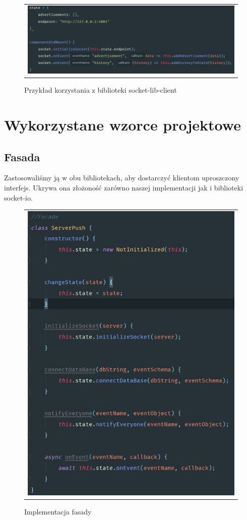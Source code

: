 \documentclass{sprawozdanie-agh}
\begin{document}
	\begin{figure}[H] 
		\centering
		\begin{tabular}{c}
			\includegraphics[width=.99\textwidth]{socket-lib-client}
		\end{tabular} 
		\caption{Przykład korzystania z biblioteki socket-lib-client}
	\end{figure}

	\section{Wykorzystane wzorce projektowe}
	\subsection{Fasada}
	
	Zastosowaliśmy ją w obu bibliotekach, aby dostarczyć klientom uproszczony interfejs. Ukrywa ona złożoność zarówno naszej implementacji jak i biblioteki socket-io.
	
	\begin{figure}[H] 
		\centering
		\begin{tabular}{c}
			\includegraphics[width=.75\textwidth]{Fasada}
		\end{tabular} 
		\caption{Implementacja fasady}
	\end{figure}
	
\end{document}
